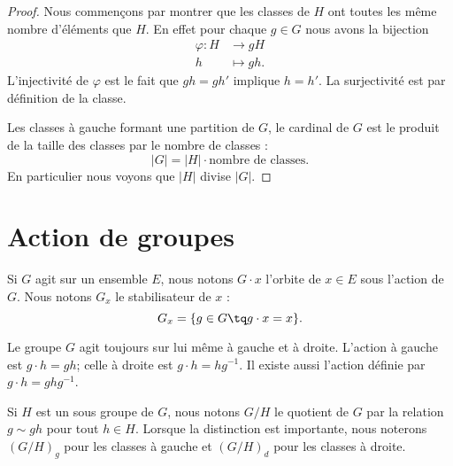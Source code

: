 \begin{proof}
    Nous commençons par montrer que les classes de \( H\) ont toutes les même nombre d'éléments que \( H\). En effet pour chaque \( g\in G\) nous avons la bijection
    \begin{equation}
        \begin{aligned}
            \varphi\colon H&\to gH \\
            h&\mapsto gh. 
        \end{aligned}
    \end{equation}
    L'injectivité de \( \varphi\) est le fait que \( gh=gh'\) implique \( h=h'\). La surjectivité est par définition de la classe. 

    Les classes à gauche formant une partition de \( G\), le cardinal de \( G\) est le produit de la taille des classes par le nombre de classes :
    \begin{equation}
        | G |=| H |\cdot\text{nombre de classes}.
    \end{equation}
    En particulier nous voyons que \( | H |\) divise \( | G |\).
\end{proof}

\section{Action de groupes}

Si \( G\) agit sur un ensemble \( E\), nous notons \( G\cdot x\) l'orbite de \( x\in E\) sous l'action de $G$. Nous notons \( G_x\) le stabilisateur de \( x\) :
\begin{equation}
    G_x=\{ g\in G\tq g\cdot x=x \}.
\end{equation}

Le groupe \( G\) agit toujours sur lui même à gauche et à droite. L'action à gauche est \( g\cdot h=gh\); celle à droite est \( g\cdot h=hg^{-1}\). Il existe aussi l'action  définie par \( g\cdot h=ghg^{-1}\).

Si \( H\) est un sous groupe de  \( G\), nous notons \( G/H\) le quotient de $G$ par la relation \( g\sim gh\) pour tout \( h\in H\). Lorsque la distinction est importante, nous noterons \( (G/H)_g\) pour les classes à gauche et \( (G/H)_d\) pour les classes à droite.

